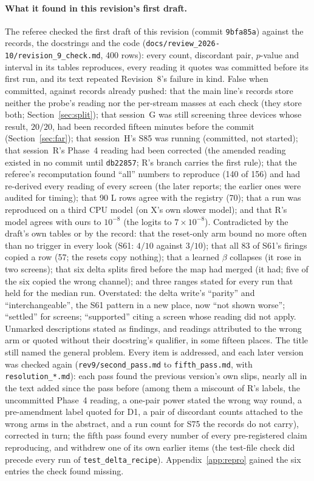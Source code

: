 \documentclass[11pt]{article}
\begin{document}
\paragraph{What it found in this revision's first draft.} The referee checked the first draft of this revision (commit \texttt{9bfa85a}) against the records, the docstrings and the code (\texttt{docs/review\_2026-10/revision\_9\_check.md}, 400 rows): every count, discordant pair, $p$-value and interval in its tables reproduces, every reading it quotes was committed before its first run, and its text repeated Revision~8's failure in kind. False when committed, against records already pushed: that the main line's records store neither the probe's reading nor the per-stream masses at each check (they store both; Section~\ref{sec:split}); that session~G was still screening three devices whose result, $20/20$, had been recorded fifteen minutes before the commit (Section~\ref{sec:far}); that session~H's S85 was running (committed, not started); that session~R's Phase~4 reading had been corrected (the amended reading existed in no commit until \texttt{db22857}; R's branch carries the first rule); that the referee's recomputation found ``all'' numbers to reproduce (140 of 156) and had re-derived every reading of every screen (the later reports; the earlier ones were audited for timing); that 90 L rows agree with the registry (70); that a run was reproduced on a third CPU model (on X's own slower model); and that R's model agrees with ours to $10^{-8}$ (the logits to $7\times10^{-8}$). Contradicted by the draft's own tables or by the record: that the reset-only arm bound no more often than no trigger in every look (S61: $4/10$ against $3/10$); that all 83 of S61's firings copied a row (57; the resets copy nothing); that a learned $\beta$ collapses (it rose in two screens); that six delta splits fired before the map had merged (it had; five of the six copied the wrong channel); and three ranges stated for every run that held for the median run. Overstated: the delta write's ``parity'' and ``interchangeable'', the S61 pattern in a new place, now ``not shown worse''; ``settled'' for screens; ``supported'' citing a screen whose reading did not apply. Unmarked descriptions stated as findings, and readings attributed to the wrong arm or quoted without their docstring's qualifier, in some fifteen places. The title still named the general problem. Every item is addressed, and each later version was checked again (\texttt{rev9/second\_pass.md} to \texttt{fifth\_pass.md}, with \texttt{resolution\_*.md}): each pass found the previous version's own slips, nearly all in the text added since the pass before (among them a miscount of R's labels, the uncommitted Phase~4 reading, a one-pair power stated the wrong way round, a pre-amendment label quoted for D1, a pair of discordant counts attached to the wrong arms in the abstract, and a run count for S75 the records do not carry), corrected in turn; the fifth pass found every number of every pre-registered claim reproducing, and withdrew one of its own earlier items (the test-file check did precede every run of \texttt{test\_delta\_recipe}). Appendix~\ref{app:repro} gained the six entries the check found missing.
\end{document}
